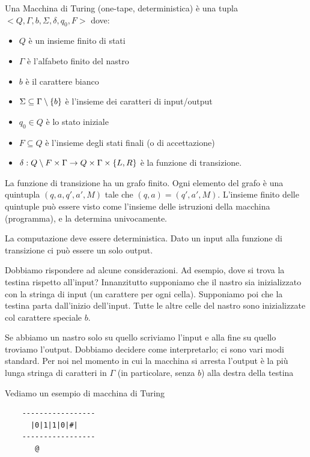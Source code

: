 Una Macchina di Turing (one-tape, deterministica) è una tupla $<Q,\Gamma,b,\Sigma,\delta,q_{0},F>$
dove:
\begin{itemize}
    \item $Q$ è un insieme finito di stati
    \item $\Gamma$ è l'alfabeto finito del nastro
    \item $b$ è il carattere bianco
    \item $\Sigma \subseteq \Gamma \setminus \{b\}$ è l'insieme dei caratteri di input/output
    \item $q_{0} \in Q$ è lo stato iniziale
    \item $F \subseteq Q$ è l'insieme degli stati finali (o di accettazione)
    \item $\delta: Q \setminus F \times \Gamma \to Q \times \Gamma \times \{L,R\}$ è la funzione di transizione.
\end{itemize}

La funzione di transizione ha un grafo finito. Ogni elemento del grafo è una quintupla $(q, a, q',
a', M)$ tale che $(q, a) = (q', a', M)$. L'insieme finito delle quintuple può essere visto come
l'insieme delle istruzioni della macchina (programma), e la determina univocamente.

La computazione deve essere deterministica. Dato un input alla funzione di transizione ci può
essere un solo output.

Dobbiamo rispondere ad alcune considerazioni. Ad esempio, dove si trova la testina rispetto
all'input?  Innanzitutto supponiamo che il nastro sia inizializzato con la stringa di input (un
carattere per ogni cella). Supponiamo poi che la testina parta dall'inizio dell'input. Tutte le
altre celle del nastro sono inizializzate col carattere speciale $b$.

Se abbiamo un nastro solo su quello scriviamo l'input e alla fine su quello troviamo l'output.
Dobbiamo decidere come interpretarlo; ci sono vari modi standard. Per noi nel momento in cui la
macchina si arresta l'output è la più lunga stringa di caratteri in $\Gamma$ (in particolare,
senza $b$) alla destra della testina

Vediamo un esempio di macchina di Turing 

\begin{verbatim}
    -----------------
      |0|1|1|0|#|
    -----------------
       @
\end{verbatim}

